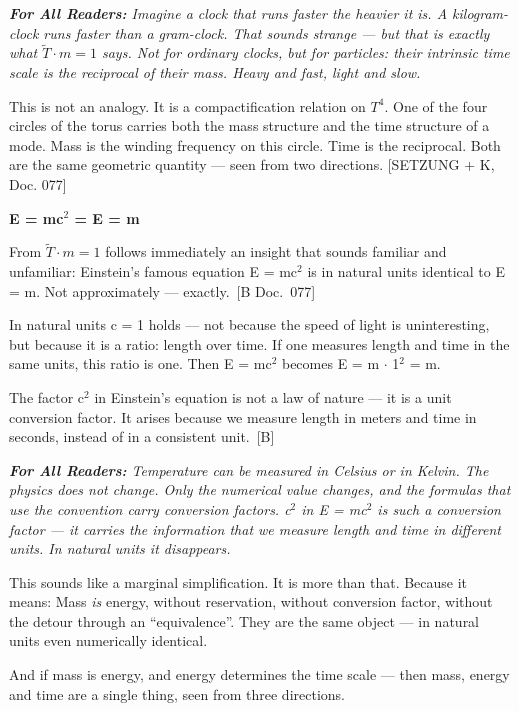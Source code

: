 \documentclass[11pt,oneside]{book}
\newcommand{\status}[1]{\penalty10000\,{\scriptsize\textcolor{gray!60}{[#1]}}}
\newenvironment{laierspur}{%
  \par\vspace{4pt}%
  \noindent\small\itshape\color{blue!60!black}%
  \textbf{For All Readers:}\enspace\ignorespaces}{%
  \par\vspace{4pt}\normalsize\normalfont\normalcolor}
\begin{document}
\begin{laierspur}
Imagine a clock that runs faster the heavier it is. A kilogram-clock runs
faster than a gram-clock. That sounds strange — but that is exactly what
$\tilde{T}\cdot m = 1$ says. Not for ordinary clocks, but for particles: their
intrinsic time scale is the reciprocal of their mass. Heavy and fast, light
and slow.
\end{laierspur}

This is not an analogy. It is a compactification relation on $T^4$. One of the
four circles of the torus carries both the mass structure and the time
structure of a mode. Mass is the winding frequency on this circle. Time is
the reciprocal. Both are the same geometric quantity — seen from two
directions. [SETZUNG + K, Doc. 077]

\textbf{E = mc$^2$ = E = m}

From $\tilde{T}\cdot m = 1$ follows immediately an insight that sounds familiar
and unfamiliar: Einstein's famous equation E = mc$^2$ is in natural units
identical to E = m. Not approximately — exactly. \status{B Doc.~077}

In natural units c = 1 holds — not because the speed of light is
uninteresting, but because it is a ratio: length over time. If one measures
length and time in the same units, this ratio is one. Then E = mc$^2$ becomes
E = m $\cdot$ 1$^2$ = m.

The factor c$^2$ in Einstein's equation is not a law of nature — it is a unit
conversion factor. It arises because we measure length in meters and time in
seconds, instead of in a consistent unit. \status{B}

\begin{laierspur}
Temperature can be measured in Celsius or in Kelvin. The physics does not
change. Only the numerical value changes, and the formulas that use the
convention carry conversion factors. c$^2$ in E = mc$^2$ is such a conversion
factor — it carries the information that we measure length and time in
different units. In natural units it disappears.
\end{laierspur}

This sounds like a marginal simplification. It is more than that. Because it
means: Mass \textit{is} energy, without reservation, without conversion factor,
without the detour through an \enquote{equivalence}. They are the same object — in
natural units even numerically identical.

And if mass is energy, and energy determines the time scale — then mass,
energy and time are a single thing, seen from three directions.
\end{document}
